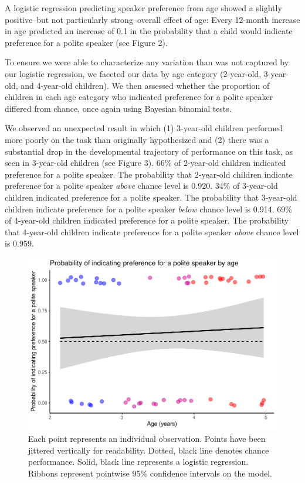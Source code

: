 \documentclass[
  english,
  man,floatsintext]{apa6}
\begin{document}
A logistic regression predicting speaker preference from age showed a slightly positive--but not particularly strong--overall effect of age: Every 12-month increase in age predicted an increase of 0.1 in the probability that a child would indicate preference for a polite speaker (see Figure 2).

To ensure we were able to characterize any variation than was not captured by our logistic regression, we faceted our data by age category (2-year-old, 3-year-old, and 4-year-old children). We then assessed whether the proportion of children in each age category who indicated preference for a polite speaker differed from chance, once again using Bayesian binomial tests.

We observed an unexpected result in which (1) 3-year-old children performed more poorly on the task than originally hypothesized and (2) there was a substantial drop in the developmental trajectory of performance on this task, as seen in 3-year-old children (see Figure 3). 66\% of 2-year-old children indicated preference for a polite speaker. The probability that 2-year-old children indicate preference for a polite speaker \emph{above} chance level is 0.920. 34\% of 3-year-old children indicated preference for a polite speaker. The probability that 3-year-old children indicate preference for a polite speaker \emph{below} chance level is 0.914. 69\% of 4-year-old children indicated preference for a polite speaker. The probability that 4-year-old children indicate preference for a polite speaker \emph{above} chance level is 0.959.

\begin{figure}
\centering
\includegraphics{writeup_files/figure-latex/unnamed-chunk-1-1.pdf}
\caption{\label{fig:unnamed-chunk-1}Each point represents an individual observation. Points have been jittered vertically for readability. Dotted, black line denotes chance performance. Solid, black line represents a logistic regression. Ribbons represent pointwise 95\% confidence intervals on the model.}
\end{figure}
\end{document}

